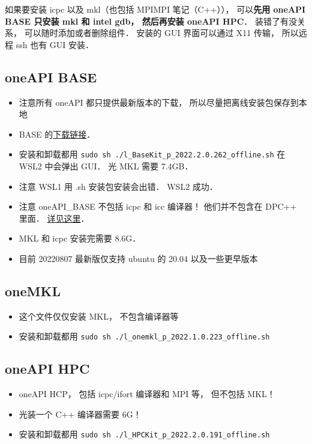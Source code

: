 

如果要安装 icpc 以及 mkl（也包括 MPIMPI 笔记（C++））， 可以\textbf{先用 oneAPI BASE 只安装 mkl 和 intel gdb， 然后再安装 oneAPI HPC}．
装错了有没关系， 可以随时添加或者删除组件． 安装的 GUI 界面可以通过 X11 传输， 所以远程 ssh 也有 GUI 安装．

\subsection{oneAPI BASE}
\begin{itemize}
\item 注意所有 oneAPI 都只提供最新版本的下载， 所以尽量把离线安装包保存到本地
\item BASE 的\href{https://www.intel.com/content/www/us/en/developer/tools/oneapi/base-toolkit-download.html?operatingsystem=linux&distributions=webdownload&options=offline}{下载链接}．
\item 安装和卸载都用 \verb`sudo sh ./l_BaseKit_p_2022.2.0.262_offline.sh` 在 WSL2 中会弹出 GUI． 光 MKL 需要 7.4GB．
\item 注意 WSL1 用 .sh 安装包安装会出错． WSL2 成功．
\item 注意 oneAPI_BASE 不包括 icpc 和 icc 编译器！ 他们并不包含在 DPC++ 里面． \href{https://stackoverflow.com/questions/66527842/can-not-find-the-icc-compiler-after-having-installed-intel-oneapi-invoking-from}{详见这里}．
\item MKL 和 icpc 安装完需要 8.6G．
\item 目前 20220807 最新版仅支持 ubuntu 的 20.04 以及一些更早版本
\end{itemize}

\subsection{oneMKL}
\begin{itemize}
\item 这个文件仅仅安装 MKL， 不包含编译器等
\item 安装和卸载都用 \verb`sudo sh ./l_onemkl_p_2022.1.0.223_offline.sh`
\end{itemize}

\subsection{oneAPI HPC}
\begin{itemize}
\item oneAPI HCP， 包括 icpc/ifort 编译器和 MPI 等， 但不包括 MKL！
\item 光装一个 C++ 编译器需要 6G！
\item 安装和卸载都用 \verb`sudo sh ./l_HPCKit_p_2022.2.0.191_offline.sh`
\end{itemize}
